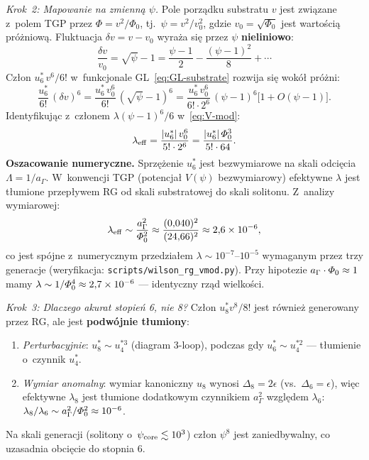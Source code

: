 \begin{proposition}
\medskip\noindent\emph{Krok~2: Mapowanie na zmienn\k{a} $\psi$.}\;
Pole porz\k{a}dku substratu $v$ jest zwi\k{a}zane z~polem TGP przez
$\Phi = v^2 / \Phi_0$, tj.~$\psi = v^2 / v_0^2$,
gdzie $v_0 = \sqrt{\Phi_0}$ jest warto\'sci\k{a} pr\'o\.zniow\k{a}.
Fluktuacja $\delta v = v - v_0$ wyra\.za si\k{e} przez $\psi$
\textbf{nieliniowo}:
\begin{equation}\label{eq:dv-to-psi}
    \frac{\delta v}{v_0} = \sqrt{\psi} - 1
    = \frac{\psi - 1}{2} - \frac{(\psi-1)^2}{8} + \cdots
\end{equation}
Cz\l{}on $u_6^*\,v^6 / 6!$ w~funkcjonale GL~\eqref{eq:GL-substrate}
rozwija si\k{e} wok\'o\l{} pr\'o\.zni:
\begin{equation}\label{eq:F-to-Vmod}
    \frac{u_6^*}{6!}\,(\delta v)^6
    = \frac{u_6^*\,v_0^6}{6!}\,(\sqrt{\psi}-1)^6
    = \frac{u_6^*\,v_0^6}{6!\cdot 2^6}\,(\psi-1)^6
      \bigl[1 + O(\psi-1)\bigr].
\end{equation}
Identyfikuj\k{a}c z~cz\l{}onem $\lambda(\psi-1)^6/6$
w~\eqref{eq:V-mod}:
\begin{equation}\label{eq:lambda-from-WF}
    \lambda_{\rm eff}
    = \frac{|u_6^*|\,v_0^6}{5!\cdot 2^6}
    = \frac{|u_6^*|\,\varPhi_0^3}{5!\cdot 64}.
\end{equation}
\textbf{Oszacowanie numeryczne.}\;
Sprzężenie $u_6^*$ jest bezwymiarowe na skali odci\k{e}cia
$\Lambda = 1/a_\Gamma$.
W~konwencji TGP (potencja\l{} $V(\psi)$ bezwymiarowy)
efektywne $\lambda$ jest t\l{}umione przep\l{}ywem RG
od skali substratowej do skali solitonu.
Z~analizy wymiarowej:
\begin{equation}\label{eq:lambda-dimensional}
    \lambda_{\rm eff}
    \sim \frac{a_\Gamma^2}{\varPhi_0^2}
    \approx \frac{(0{,}040)^2}{(24{,}66)^2}
    \approx 2{,}6 \times 10^{-6},
\end{equation}
co jest sp\'ojne z~numerycznym przedzia\l{}em
$\lambda \sim 10^{-7}\text{--}10^{-5}$ wymaganym przez trzy generacje
(weryfikacja: \texttt{scripts/wilson\_rg\_vmod.py}).
Przy hipotezie $a_\Gamma\cdot\varPhi_0 \approx 1$ mamy
$\lambda \sim 1/\varPhi_0^4 \approx 2{,}7 \times 10^{-6}$
--- identyczny rz\k{a}d wielko\'sci.

\medskip\noindent\emph{Krok~3: Dlaczego akurat stopie\'n 6, nie 8?}\;
Cz\l{}on $u_8^* v^8 / 8!$ jest r\'ownie\.z generowany przez RG,
ale jest \textbf{podw\'ojnie t\l{}umiony}:
\begin{enumerate}[nosep]
  \item \emph{Perturbacyjnie}: $u_8^* \sim u_4^{*3}$ (diagram 3-loop),
    podczas gdy $u_6^* \sim u_4^{*2}$ --- t\l{}umienie o~czynnik $u_4^*$.
  \item \emph{Wymiar anomalny}: wymiar kanoniczny $u_8$ wynosi
    $\Delta_8 = 2\epsilon$ (vs.\ $\Delta_6 = \epsilon$), wi\k{e}c
    efektywne $\lambda_8$ jest t\l{}umione dodatkowym czynnikiem
    $a_\Gamma^2$ wzgl\k{e}dem $\lambda_6$:
    $\lambda_8/\lambda_6 \sim a_\Gamma^2/\varPhi_0^2 \approx 10^{-6}$.
\end{enumerate}
Na skali generacji (solitony o~$\psi_{\rm core} \lesssim 10^3$)
cz\l{}on $\psi^8$ jest zaniedbywalny, co uzasadnia obci\k{e}cie
do stopnia 6.
\end{proposition}

